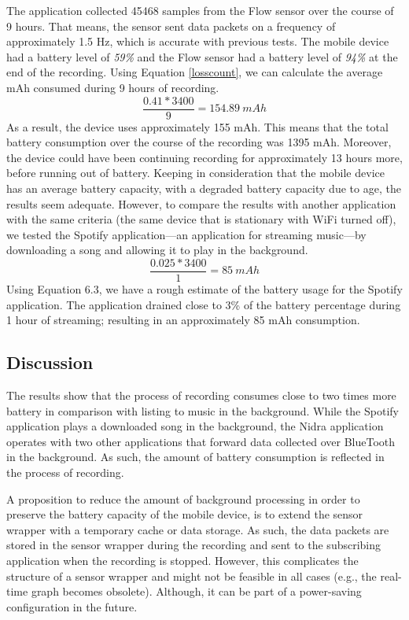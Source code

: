 The application collected 45468 samples from the Flow sensor over the course of 9 hours. That means, the sensor sent data packets on a frequency of approximately 1.5 Hz, which is accurate with previous tests. The mobile device had a battery level of \textit{59\%} and the Flow sensor had a battery level of \textit{94\%} at the end of the recording. Using Equation \ref{losscount}, we can calculate the average mAh consumed during 9 hours of recording. 
\begin{equation}
\frac{0.41 * 3400}{9} = 154.89\ mAh
\end{equation}
As a result, the device uses approximately 155 mAh. This means that the total battery consumption over the course of the recording was 1395 mAh. Moreover, the device could have been continuing recording for approximately 13 hours more, before running out of battery. Keeping in consideration that the mobile device has an average battery capacity, with a degraded battery capacity due to age, the results seem adequate. However, to compare the results with another application with the same criteria (the same device that is stationary with WiFi turned off), we tested the Spotify application---an application for streaming music---by downloading a song and allowing it to play in the background.
\begin{equation}
\frac{0.025 * 3400}{1} = 85\ mAh
\end{equation}
Using Equation 6.3, we have a rough estimate of the battery usage for the Spotify application. The application drained close to 3\% of the battery percentage during 1 hour of streaming; resulting in an approximately 85 mAh consumption.  

\subsection{Discussion}
The results show that the process of recording consumes close to two times more battery in comparison with listing to music in the background. While the Spotify application plays a downloaded song in the background, the Nidra application operates with two other applications that forward data collected over BlueTooth in the background. As such, the amount of battery consumption is reflected in the process of recording. 

A proposition to reduce the amount of background processing in order to preserve the battery capacity of the mobile device, is to extend the sensor wrapper with a temporary cache or data storage. As such, the data packets are stored in the sensor wrapper during the recording and sent to the subscribing application when the recording is stopped. However, this complicates the structure of a sensor wrapper and might not be feasible in all cases (e.g., the real-time graph becomes obsolete). Although, it can be part of a power-saving configuration in the future. 


